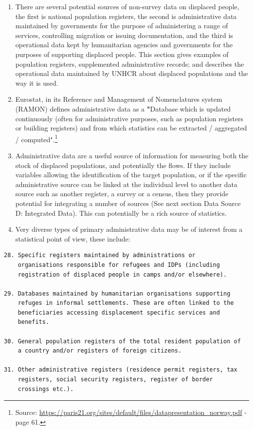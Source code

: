\documentclass[
]{article}
\begin{document}
\begin{enumerate}
\def\labelenumi{\arabic{enumi}.}
\setcounter{enumi}{145}
\item
  There are several potential sources of non-survey data on displaced
  people, the first is national population registers, the second is
  administrative data maintained by governments for the purpose of
  administering a range of services, controlling migration or issuing
  documentation, and the third is operational data kept by
  humanitarian agencies and governments for the purposes of supporting
  displaced people. This section gives examples of population
  registers, supplemented administrative records; and describes the
  operational data maintained by UNHCR about displaced populations and
  the way it is used.
\item
  Eurostat, in its Reference and Management of Nomenclatures system
  (RAMON) defines administrative data as a \textbf{"}Database which is
  updated continuously (often for administrative purposes, such as
  population registers or building registers) and from which
  statistics can be extracted / aggregated / computed".\footnote{Source:
    \url{https://paris21.org/sites/default/files/datapresentation_norway.pdf}
    - page 61.}
\item
  Administrative data are a useful source of information for
  measuring both the stock of displaced populations, and potentially
  the flows. If they include variables allowing the identification of
  the target population, or if the specific administrative source can
  be linked at the individual level to another data source such as
  another register, a survey or a census, then they provide potential
  for integrating a number of sources (See next section Data Source D:
  Integrated Data). This can potentially be a rich source of
  statistics.
\item
  Very diverse types of primary administrative data may be of
  interest from a statistical point of view, these include:
\end{enumerate}

\begin{verbatim}
28. Specific registers maintained by administrations or
    organisations responsible for refugees and IDPs (including
    registration of displaced people in camps and/or elsewhere).

29. Databases maintained by humanitarian organisations supporting
    refuges in informal settlements. These are often linked to the
    beneficiaries accessing displacement specific services and
    benefits.

30. General population registers of the total resident population of
    a country and/or registers of foreign citizens.

31. Other administrative registers (residence permit registers, tax
    registers, social security registers, register of border
    crossings etc.).
\end{verbatim}
\end{document}
